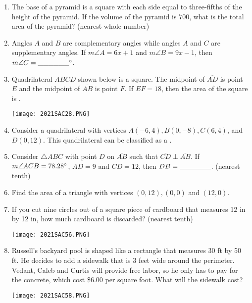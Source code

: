\documentclass[../uilmath.tex]{subfiles}
\begin{document}
\begin{enumerate}[label=\bfseries\arabic*.]
    \item %
    The base of a pyramid is a square with each side equal to three-fifths of the height of the pyramid. If the volume 
    of the pyramid is 700, what is the total area of the pyramid? (nearest whole number)

    \item %
    Angles $A$ and $B$ are complementary angles while angles $A$ and $C$ are supplementary angles. If 
    $m\angle A = 6x+1$ and $m\angle B = 9x-1$, then $m\angle C = \_\_\_\_\_\_\degree$.

    \item %
    Quadrilateral $ABCD$ shown below is a square. The midpoint of $\overline{AD}$ is point $E$ and the midpoint of 
    $\overline{AB}$ is point $F$. If $EF=18$, then the area of the square is \blank.

    \begin{center}
        \texttt{[image: 2021SAC28.PNG]}
    \end{center}

    \item %
    Consider a quadrilateral with vertices $A(-6,4), B(0,-8), C(6,4)$, and $D(0,12)$. This quadrilateral can be classified as a \blank.

    \item %
    Consider $\triangle ABC$ with point $D$ on $\overline{AB}$ such that $\overline{CD}\perp \overline{AB}$. If $m\angle ACB=78.28\degree$, $AD=9$ and $CD=12$, then $DB=\_\_\_\_\_\_$. (nearest tenth)
    
    \item %
    Find the area of a triangle with vertices $(0,12), (0,0)$ and $(12,0)$.

    \item %
    If you cut nine circles out of a square piece of cardboard that measures 12 in by 12 in, how much cardboard is discarded? (nearest tenth)
    \begin{center}
        \texttt{[image: 2021SAC56.PNG]}
    \end{center}

    \item %
    Russell's backyard pool is shaped like a rectangle that measures 30 ft by 50 ft. He decides to add a sidewalk that is 3 feet wide around the perimeter. Vedant, Caleb
    and Curtis will provide free labor, so he only has to pay for the concrete, which cost \$6.00 per square foot. What will the sidewalk cost?
    \begin{center}
        \texttt{[image: 2021SAC58.PNG]}
    \end{center}


\end{enumerate}
\end{document}
